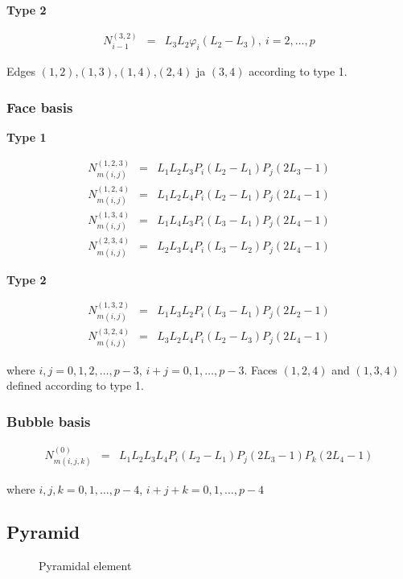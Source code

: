 \noindent \textbf{Type 2}

\begin{eqnarray*}
N_{i-1}^{(3,2)}&=&L_3L_2\varphi_i(L_2-L_3),\ i=2,\ldots,p
\end{eqnarray*}

\noindent Edges $(1,2)$,$(1,3)$,$(1,4)$,$(2,4)$ ja $(3,4)$ according to type 1.

\subsubsection{Face basis}

\noindent \textbf{Type 1}

\begin{eqnarray*}
N_{m(i,j)}^{(1,2,3)}&=&L_1L_2L_3P_i(L_2-L_1)P_j(2L_3-1) \\
N_{m(i,j)}^{(1,2,4)}&=&L_1L_2L_4P_i(L_2-L_1)P_j(2L_4-1) \\
N_{m(i,j)}^{(1,3,4)}&=&L_1L_4L_3P_i(L_3-L_1)P_j(2L_4-1) \\
N_{m(i,j)}^{(2,3,4)}&=&L_2L_3L_4P_i(L_3-L_2)P_j(2L_4-1) 
\end{eqnarray*}

\noindent \textbf{Type 2}

\begin{eqnarray*}
N_{m(i,j)}^{(1,3,2)}&=&L_1L_3L_2P_i(L_3-L_1)P_j(2L_2-1) \\
N_{m(i,j)}^{(3,2,4)}&=&L_3L_2L_4P_i(L_2-L_3)P_j(2L_4-1) 
\end{eqnarray*}

\noindent where $i,j=0,1,2,\ldots,p-3$, $i+j=0,1,\ldots,p-3$. Faces $(1,2,4)$ and $(1,3,4)$ defined according to type 1.

\subsubsection{Bubble basis}

\begin{eqnarray*}
N_{m(i,j,k)}^{(0)}&=&L_1L_2L_3L_4P_i(L_2-L_1)P_j(2L_3-1)P_k(2L_4-1)
\end{eqnarray*}

\noindent where $i,j,k=0,1,\ldots,p-4$, $i+j+k=0,1,\ldots,p-4$ 

\subsection{Pyramid}

\begin{figure}[tbhp]
\begin{center}

\caption{Pyramidal element}
\end{center}
\end{figure}

